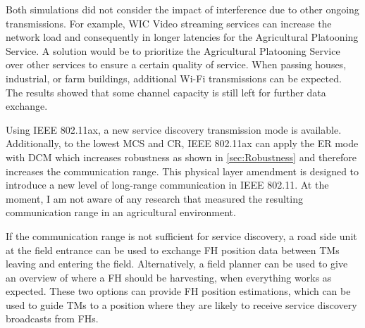 Both simulations did not consider the impact of interference due to other ongoing transmissions.
For example, \ac{WIC} Video streaming services can increase the network load and consequently in longer latencies for
the Agricultural Platooning Service.
A solution would be to prioritize the Agricultural Platooning Service over other services
to ensure a certain quality of service.
When passing houses, industrial, or farm buildings, additional Wi-Fi transmissions can be expected. The results showed that some channel capacity is still left for further data exchange. 

Using IEEE 802.11ax, a new service discovery transmission mode is available.
Additionally, to the lowest \ac{MCS} and \ac{CR},
IEEE 802.11ax can apply the \ac{ER} mode with \ac{DCM} which increases robustness as shown in \autoref{sec:Robustness}
and therefore increases the communication range.
This physical layer amendment is designed to introduce a new level of long-range communication in IEEE 802.11.
At the moment, I am not aware of any research that measured the resulting communication range in an agricultural environment.

If the communication range is not sufficient for service discovery, a road side unit at the field entrance can be used to exchange \ac{FH} position data
between \acp{TM} leaving and entering the field.
Alternatively, a field planner can be used to give an overview of where a \ac{FH} should be harvesting,
when everything works as expected.
These two options can provide \ac{FH} position estimations, which can be used to guide \acp{TM} to a position where they are likely
to receive service discovery broadcasts from \acp{FH}.







